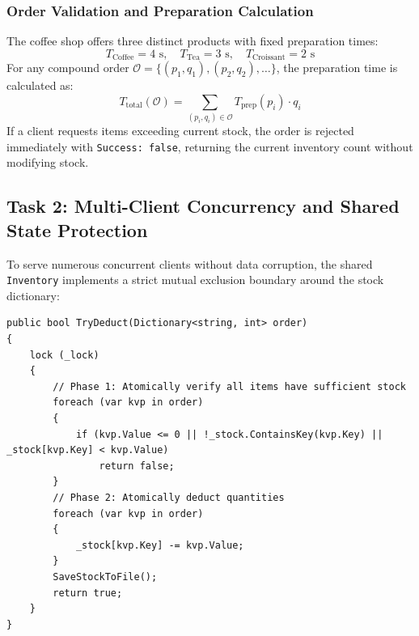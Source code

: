 \documentclass[12pt,a4paper]{article}
\begin{document}
\subsubsection{Order Validation and Preparation Calculation}
The coffee shop offers three distinct products with fixed preparation times:
\begin{equation}
    T_{\text{Coffee}} = 4\text{ s}, \quad T_{\text{Tea}} = 3\text{ s}, \quad T_{\text{Croissant}} = 2\text{ s}
\end{equation}
For any compound order $\mathcal{O} = \{(p_1, q_1), (p_2, q_2), \dots\}$, the preparation time is calculated as:
\begin{equation}
    T_{\text{total}}(\mathcal{O}) = \sum_{(p_i, q_i) \in \mathcal{O}} T_{\text{prep}}(p_i) \cdot q_i
\end{equation}
If a client requests items exceeding current stock, the order is rejected immediately with \texttt{Success: false}, returning the current inventory count without modifying stock.

\subsection{Task 2: Multi-Client Concurrency and Shared State Protection}
To serve numerous concurrent clients without data corruption, the shared \texttt{Inventory} implements a strict mutual exclusion boundary around the stock dictionary:
\begin{lstlisting}
public bool TryDeduct(Dictionary<string, int> order)
{
    lock (_lock)
    {
        // Phase 1: Atomically verify all items have sufficient stock
        foreach (var kvp in order)
        {
            if (kvp.Value <= 0 || !_stock.ContainsKey(kvp.Key) || _stock[kvp.Key] < kvp.Value)
                return false;
        }
        // Phase 2: Atomically deduct quantities
        foreach (var kvp in order)
        {
            _stock[kvp.Key] -= kvp.Value;
        }
        SaveStockToFile();
        return true;
    }
}
\end{lstlisting}
\end{document}
